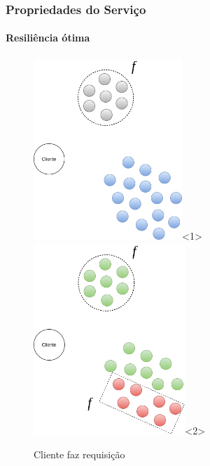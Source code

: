 \documentclass{beamer}
\begin{document}
\begin{frame}
  \frametitle{Propriedades do Serviço}
  \framesubtitle{Resiliência ótima}

  \begin{figure}
    \includegraphics[width=0.5\textwidth]{images/resiliencia01}<1>
    \includegraphics[width=0.51\textwidth]{images/resiliencia02}<2>
    \caption{Cliente faz requisição}
  \end{figure}

\end{frame}
\end{document}
